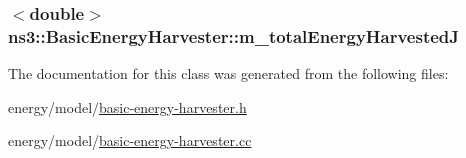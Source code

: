 \subsubsection[{\texorpdfstring{m\+\_\+total\+Energy\+HarvestedJ}{m_totalEnergyHarvestedJ}}]{$<$double$>$ ns3\+::\+Basic\+Energy\+Harvester\+::m\+\_\+total\+Energy\+HarvestedJ\hspace{0.3cm}{\ttfamily [private]}}\hypertarget{classns3_1_1BasicEnergyHarvester_a87500c5e34a0f4cf246b20bd7b25a3d0}{}\label{classns3_1_1BasicEnergyHarvester_a87500c5e34a0f4cf246b20bd7b25a3d0}


The documentation for this class was generated from the following files\+:\begin{DoxyCompactItemize}
\item 
energy/model/\hyperlink{basic-energy-harvester_8h}{basic-\/energy-\/harvester.\+h}\item 
energy/model/\hyperlink{basic-energy-harvester_8cc}{basic-\/energy-\/harvester.\+cc}\end{DoxyCompactItemize}
